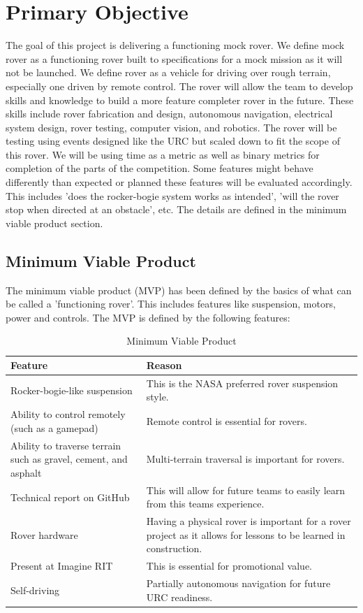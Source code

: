 \documentclass[conference]{IEEEtran} %
\begin{document}
\section{Primary Objective}
\label{sec:primary-obj}
The goal of this project is delivering a functioning mock rover.
We define mock rover as a functioning rover built to specifications for a mock mission as it will not be launched. 
We define rover as a vehicle for driving over rough terrain, especially one driven by remote control.
The rover will allow the team to develop skills and knowledge to build a
more feature completer rover in the future. 
These skills include rover fabrication and design, autonomous navigation, electrical system design, rover testing, computer vision, and robotics.
The rover will be testing using events designed like the URC but scaled down to fit the scope of this rover. 
We will be using time as a metric as well as binary metrics for completion of the parts of the competition. 
Some features might behave differently than expected or planned these features will be evaluated accordingly.
This includes ’does the rocker-bogie system works as intended’, ’will the rover stop when directed at an obstacle’, etc. 
The details are defined in the minimum viable product section.

\subsection{Minimum Viable Product}
\label{subsec:mvp}
The minimum viable product (MVP) has been defined by the basics of what can be called a 'functioning rover'. This includes features like suspension, motors, power and controls. The MVP is defined by the following features: 

\begin{table}[hb!]
    \caption{Minimum Viable Product}
    \centering
    {\renewcommand{\arraystretch}{1.5}
    \begin{tabularx}{\linewidth}{LL} 
    \hline
    \textbf{Feature} & \textbf{Reason} \\
    \hline
    Rocker-bogie-like suspension & This is the NASA preferred rover suspension style. \\
    Ability to control remotely (such as a gamepad) & Remote control is essential for rovers. \\
    Ability to traverse terrain such as gravel, cement, and asphalt & Multi-terrain traversal is important for rovers. \\
    Technical report on GitHub & This will allow for future teams to easily learn from this teams experience. \\
    Rover hardware & Having a physical rover is important for a rover project as it allows for lessons to be learned in construction. \\ 
    Present at Imagine RIT & This is essential for promotional value. \\
    Self-driving & Partially autonomous navigation for future URC readiness. \\
    \hline
    \end{tabularx}
    }
\label{tab:mvp-one}
\end{table}
\end{document}
